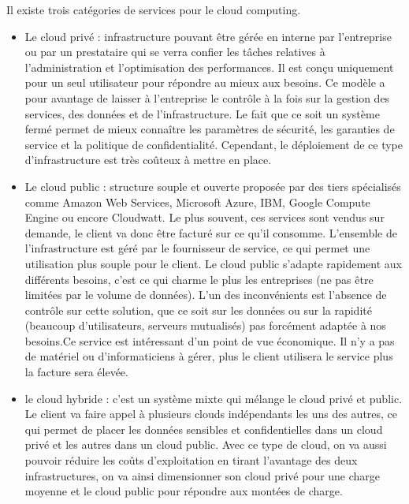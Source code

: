 \documentclass[]{article}
\begin{document}
Il existe trois catégories de services pour le cloud computing.
\begin{itemize}
\item
  Le cloud privé : infrastructure pouvant être gérée en interne par
  l'entreprise ou par un prestataire qui se verra confier les tâches
  relatives à l'administration et l'optimisation des performances. Il
  est conçu uniquement pour un seul utilisateur pour répondre au mieux
  aux besoins. Ce modèle a pour avantage de laisser à l'entreprise le
  contrôle à la fois sur la gestion des services, des données et de
  l'infrastructure. Le fait que ce soit un système fermé permet de mieux
  connaître les paramètres de sécurité, les garanties de service et la
  politique de confidentialité. Cependant, le déploiement de ce type
  d'infrastructure est très coûteux à mettre en place.
 
\item
  Le cloud public : structure souple et ouverte proposée par des tiers
  spécialisés comme Amazon Web Services, Microsoft Azure, IBM, Google
  Compute Engine ou encore Cloudwatt. Le plus souvent, ces services sont
  vendus sur demande, le client va donc être facturé sur ce qu'il
  consomme. L'ensemble de l'infrastructure est géré par le fournisseur
  de service, ce qui permet une utilisation plus souple pour le client.
  Le cloud public s'adapte rapidement aux différents besoins, c'est ce
  qui charme le plus les entreprises (ne pas être limitées par le volume
  de données). L'un des inconvénients est l'absence de contrôle sur
  cette solution, que ce soit sur les données ou sur la rapidité (beaucoup
  d'utilisateurs, serveurs mutualisés) pas forcément adaptée à nos
  besoins.Ce service est intéressant d'un point de vue économique. Il n'y a pas de matériel
  ou d'informaticiens à gérer, plus le client utilisera le service
  plus la facture sera élevée.
  
\item
  le cloud hybride : c'est un système mixte qui mélange le cloud privé et
  public. Le client va faire appel à plusieurs clouds indépendants les
  uns des autres, ce qui permet de placer les données sensibles et
  confidentielles dans un cloud privé et les autres dans un cloud
  public. Avec ce type de cloud, on va aussi pouvoir réduire les coûts
  d'exploitation en tirant l'avantage des deux infrastructures, on va
  ainsi dimensionner son cloud privé pour une charge moyenne et le cloud
  public pour répondre aux montées de charge.
\end{itemize}
\end{document}
